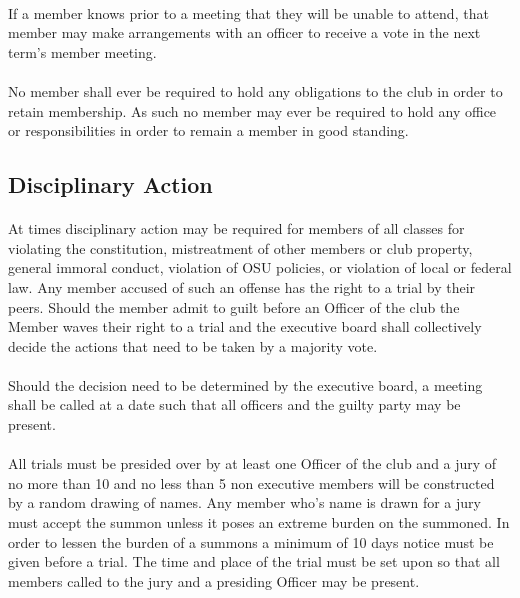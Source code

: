 \documentclass[12pt]{article}
\begin{document}
\paragraph{}
If a member knows prior to a meeting that they will be unable to attend, that member may make 
arrangements with an officer to receive a vote in the next term's member meeting.

\paragraph{}
No member shall ever be required to hold any obligations to the club in order to retain membership.
As such no member may ever be required to hold any office or responsibilities in order to remain
a member in good standing.

\subsection{Disciplinary Action}
\paragraph{}
At times disciplinary action may be required for members of all classes for violating the constitution, mistreatment of other members or club property, general immoral conduct, violation of OSU policies,
or violation of local or federal law. 
Any member accused of such an offense has the right to a trial by their peers. 
Should the member admit to guilt before an Officer of the club the Member waves their right to a trial and the executive board shall collectively decide the actions that need to be taken by a majority vote.

\paragraph{}
Should the decision need to be determined by the executive board, a meeting shall be called at a date such that all officers and the guilty party may be present.

\paragraph{} 
All trials must be presided over by at least one Officer of the club and a jury of no more than 10 and no less than 5 non executive members will be constructed by a random drawing of names. 
Any member who's name is drawn for a jury must accept the summon unless it poses an extreme burden on the summoned. In order to lessen the burden of a summons a minimum of 10 days notice must be given before a trial. The time and place of the trial must be set upon so that all members called to the jury and a presiding Officer may be present. 
\end{document}
